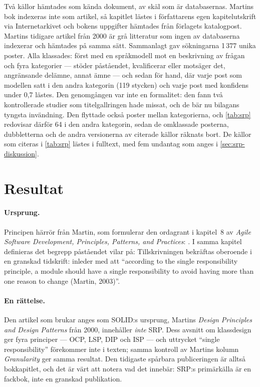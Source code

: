 Två källor hämtades som kända dokument, av skäl som är databasernas.
Martins bok indexeras inte som artikel, så kapitlet lästes i författarens
egen kapitelutskrift via Internetarkivet och bokens uppgifter hämtades
från förlagets katalogpost.  Martins tidigare artikel från 2000 är grå
litteratur som ingen av databaserna indexerar och hämtades på samma sätt.
Sammanlagt gav sökningarna 1\,377 unika poster.  Alla klassades: först
med en språkmodell mot en beskrivning av frågan och fyra kategorier ---
stöder påståendet, kvalificerar eller motsäger det, angränsande delämne,
annat ämne --- och sedan för hand, där varje post som modellen satt i den
andra kategorin (119 stycken) och varje post med konfidens under 0,7
lästes.  Den genomgången var inte en formalitet: den fann två
kontrollerade studier som titelgallringen hade missat, och de bär nu
bilagans tyngsta invändning.  Den flyttade också poster mellan
kategorierna, och \cref{tab:srp} redovisar därför 64 i den andra
kategorin, sedan de omklassade posterna, dubbletterna och de andra
versionerna av citerade källor räknats bort.  De källor som citeras i
\cref{tab:srp} lästes i fulltext, med fem undantag som anges i
\cref{sec:srp-diskussion}.

\section{Resultat}
\label{sec:srp-resultat}

\paragraph{Ursprung.}  Principen härrör från Martin, som formulerar den
ordagrant i kapitel~8 av \emph{Agile Software Development, Principles,
Patterns, and Practices}: .  I samma kapitel
definieras det begrepp påståendet vilar på:
  Tillskrivningen bekräftas oberoende i
en granskad tidskrift: \textcite{Ardalani2024Supporting} inleder med att
\enquote{according to the single responsibility principle, a module should
have a single responsibility to avoid having more than one reason to
change (Martin, 2003)}.

\paragraph{En rättelse.}  Den artikel som brukar anges som SOLID:s
ursprung, Martins \emph{Design Principles and Design Patterns} från 2000,
innehåller \emph{inte} SRP\autocite{Martin2000Design}.  Dess avsnitt om
klassdesign ger fyra principer --- OCP, LSP, DIP och ISP --- och uttrycket
\enquote{single responsibility} förekommer inte i texten; samma kontroll
av Martins kolumn \emph{Granularity} ger samma resultat.  Den tidigaste
spårbara publiceringen är alltså bokkapitlet, och det är värt att
notera vad det innebär: SRP:s primärkälla är en fackbok, inte en
granskad publikation.

